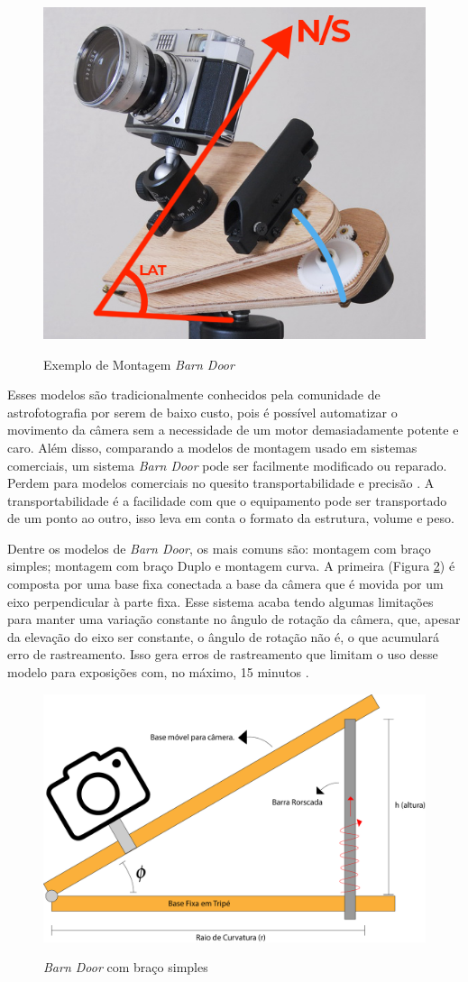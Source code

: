\begin{figure}[!htb]
	\centering
	\caption{Exemplo de Montagem \textit{Barn Door}}
	\includegraphics[width=0.5\linewidth]{figuras/barndoorexample}
	\label{fig:barndoorexample}
\end{figure}


Esses modelos são tradicionalmente conhecidos pela comunidade de astrofotografia por serem de baixo custo, pois é possível automatizar o movimento da câmera sem a necessidade de um motor demasiadamente potente e caro. Além disso, comparando a modelos de montagem usado em sistemas comerciais, um sistema \textit{Barn Door} pode ser facilmente modificado ou reparado. Perdem para modelos comerciais no quesito transportabilidade e precisão \cite{site:pentaxBarnDoor}. A transportabilidade é a facilidade com que o equipamento pode ser transportado de um ponto ao outro, isso leva em conta o formato da estrutura, volume e peso.
 
Dentre os modelos de \textit{Barn Door}, os mais comuns são: montagem com braço simples; montagem com braço Duplo e montagem curva. A primeira (Figura \ref{fig:singleArm}) é composta por uma base fixa conectada a base da câmera que é movida por um eixo perpendicular à parte fixa. Esse sistema acaba tendo algumas limitações para manter uma variação constante no ângulo de rotação da câmera, que, apesar da elevação do eixo ser constante, o ângulo de rotação não é, o que acumulará erro de rastreamento. Isso gera erros de rastreamento que limitam o uso desse modelo para exposições com, no máximo, 15 minutos \cite{artigo:davidtrottinventions}. 

\begin{figure}[!htb]
	\centering
	\caption{\textit{Barn Door} com braço simples}
	\includegraphics[width=0.6\linewidth]{figuras/bracosimples}
	\label{fig:singleArm}
\end{figure}

